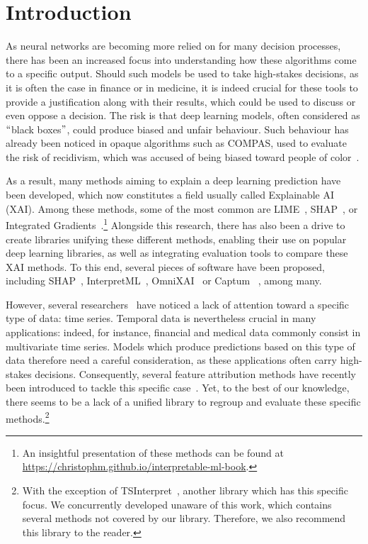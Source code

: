 \section{Introduction}
\label{sec:introduction}

As neural networks are becoming more relied on for many decision processes, there has been an increased focus into
understanding how these algorithms come to a specific output.
Should such models be used to take high-stakes decisions, as it is often the case in finance or in medicine, it is
indeed crucial for these tools to provide a justification along with their results, which could be used to discuss
or even oppose a decision.
The risk is that deep learning models, often considered as $``$black boxes$"$, could produce biased and unfair behaviour.
Such behaviour has already been noticed in opaque algorithms such as COMPAS, used to evaluate the risk of recidivism,
which was accused of being biased toward people of color~\citep{rudin2019stop}.

As a result, many methods aiming to explain a deep learning prediction have been developed, which now constitutes a
field usually called Explainable AI (XAI).
Among these methods, some of the most common are LIME~\citep{ribeiro2016should}, SHAP~\citep{lundberg2017unified},
or Integrated Gradients~\citep{sundararajan2017axiomatic}.\footnote{
    An insightful presentation of these methods can be found at \url{https://christophm.github.io/interpretable-ml-book}.
}
Alongside this research, there has also been a drive to create libraries unifying these different methods, enabling
their use on popular deep learning libraries, as well as integrating evaluation tools to compare these XAI methods.
To this end, several pieces of software have been proposed, including SHAP~\citep{lundberg2017unified},
InterpretML~\citep{nori2019interpretml}, OmniXAI~\citep{wenzhuo2022-omnixai} or Captum~\citep{kokhlikyan2020captum}
, among many.

However, several researchers~\citep{tonekaboni2020went, crabbe2021explaining} have noticed a lack of attention toward
a specific type of data: time series.
Temporal data is nevertheless crucial in many applications: indeed, for instance, financial and medical data commonly
consist in multivariate time series.
Models which produce predictions based on this type of data therefore need a careful consideration, as these
applications often carry high-stakes decisions.
Consequently, several feature attribution methods have recently been introduced to tackle this specific
case~\citep{choi2016retain, tonekaboni2020went, crabbe2021explaining}.
Yet, to the best of our knowledge, there seems to be a lack of a unified library to regroup and evaluate these specific
methods.\footnote{
    With the exception of TSInterpret~\citep{hollig2022tsinterpret}, another library which has this specific focus.
    We concurrently developed \texttt{} unaware of this work, which contains several methods
    not covered by our library.
    Therefore, we also recommend this library to the reader.
}

